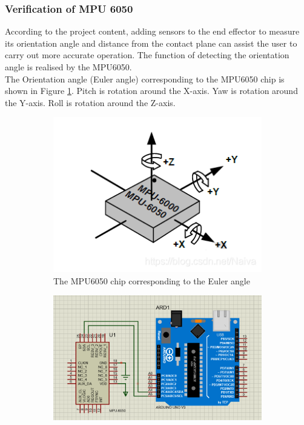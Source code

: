 \subsubsection{Verification of MPU 6050}
According to the project content, adding sensors to the end effector to measure its orientation angle and distance 
from the contact plane can assist the user to carry out more accurate operation. The function of detecting the 
orientation angle is realised by the MPU6050. \\
The Orientation angle (Euler angle) corresponding to the MPU6050 chip is shown in Figure \ref{fig:mpu6050_chip}. 
Pitch is rotation around the X-axis. Yaw is rotation around the Y-axis. Roll is rotation around the Z-axis. 
\begin{figure}[H] %
    \centering
    \captionsetup{labelsep=colon}
    \begin{subfigure}{0.45\textwidth} %
        \centering
        \includegraphics[width=\linewidth]{Image/Design/MPU6050_chip.png}
        \caption{\centering The MPU6050 chip corresponding to the Euler angle}
        \label{fig:mpu6050_chip}
    \end{subfigure}
    \begin{subfigure}{0.45\textwidth} %
        \centering
        \includegraphics[width=\linewidth]{Image/Design/MPU6050_circuit.png}

\end{subfigure}
\end{figure}

